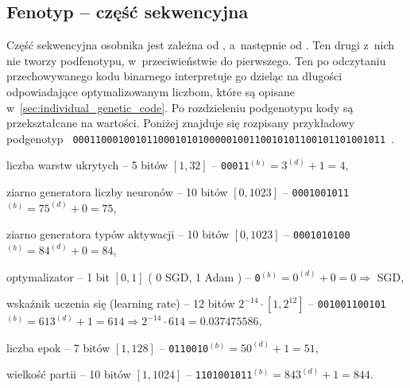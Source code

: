 \subsection{Fenotyp -- część sekwencyjna}
\label{subsec:fenotype_seq}
Część sekwencyjna osobnika jest zależna
od \textbf{},
a~następnie od \textbf{}.
Ten drugi z~nich nie tworzy podfenotypu,
w~przeciwieństwie do pierwszego.
Ten po odczytaniu przechowywanego kodu binarnego
interpretuje go dzieląc na długości
odpowiadające optymalizowanym liczbom,
które są opisane w~\cref{sec:individual_genetic_code}.
Po rozdzieleniu podgenotypu kody są
przekształcane na wartości.
Poniżej znajduje się rozpisany przykładowy podgenotyp
\texttt{%
  0001100010010110001010100000100110010101100101101001011%
}.
\begin{nospitemize}
  \item liczba warstw ukrytych
    -- 5 bitów $\left[1, 32\right]$
    -- \texttt{00011}$\displaystyle
      {}^{\left(b\right)}
        =3^{\left(d\right)}+1
        =4
    $,
  \item ziarno generatora liczby neuronów
    -- 10 bitów $\left[0, 1023\right]$
    -- \texttt{0001001011}$\displaystyle
      {}^{\left(b\right)}
        =75^{\left(d\right)}+0
        =75
    $,
  \item ziarno generatora typów aktywacji
    -- 10 bitów $\left[0, 1023\right]$
    -- \texttt{0001010100}$\displaystyle
      {}^{\left(b\right)}
        =84^{\left(d\right)}+0
        =84
    $,
  \item optymalizator
    -- 1 bit $\left[0, 1\right]$
    (%
      0 {\textrightarrow} SGD,
      1 {\textrightarrow} Adam%
    ) -- \texttt{0}$\displaystyle
      {}^{\left(b\right)}
        =0^{\left(d\right)}+0
        =0
    \Rightarrow$ SGD,
  \item wskaźnik uczenia się (learning rate)
    -- 12 bitów $
      {2^{-14}} {\cdot} {\left[1, 2^{12}\right]}
    $
    -- \texttt{001001100101}$\displaystyle
      {}^{\left(b\right)}
        =613^{\left(d\right)}+1
    $\break$\displaystyle
        =614
      \Rightarrow 2^{-14} \cdot 614
        = 0.037475586
    $,
  \item liczba epok
    -- 7 bitów $\left[1, 128\right]$
    -- \texttt{0110010}$\displaystyle
      {}^{\left(b\right)}
        =50^{\left(d\right)}+1
        =51
    $,
  \item wielkość partii
    -- 10 bitów $\left[1, 1024\right]$
    -- \texttt{1101001011}$\displaystyle
      {}^{\left(b\right)}
        =843^{\left(d\right)}+1
        =844
    $.
\end{nospitemize}

